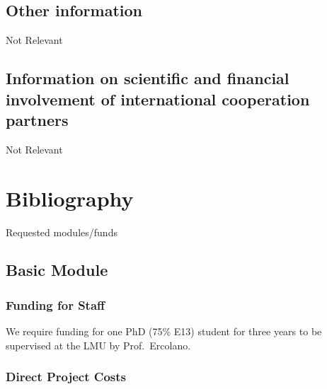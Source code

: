 \documentclass[10pt,fleqn,twoside]{article}
\begin{document}
\subsection{Other information}

Not Relevant

\subsection{Information on scientific and financial involvement of international cooperation partners}

Not Relevant

\section{Bibliography}

\begingroup
\renewcommand{\section}[2]{}%


\endgroup

\section{Requested modules/funds}
\renewcommand{\leftmark}{\sc  Requested modules/funds}

\subsection{Basic Module}

\subsubsection{Funding for Staff}

We require funding for one PhD (75\% E13) student for three years to be supervised at the LMU
by Prof.\ Ercolano.

\subsubsection{Direct Project Costs}
\end{document}
